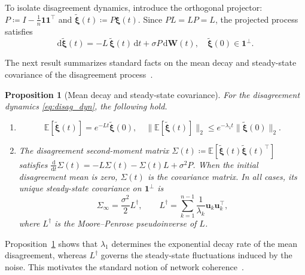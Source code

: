 \documentclass[11pt]{article}
\numberwithin{equation}{section}
\newtheorem{proposition}[theorem]{Proposition}
\theoremstyle{definition}
\theoremstyle{remark}
\begin{document}
To isolate disagreement dynamics, introduce the orthogonal projector: $P\coloneqq I-\frac{1}{n}\boldsymbol{1}\boldsymbol{1}^\top$ and $\widetilde{\boldsymbol{\xi}}(t)\coloneqq P\boldsymbol{\xi}(t).$
Since $PL=LP=L$, the projected process satisfies
\begin{equation}\label{eq:disag_dyn}
	\mathrm{d}\widetilde{\boldsymbol{\xi}}(t)
	=
	-L\,\widetilde{\boldsymbol{\xi}}(t)\,\mathrm{d}t
	+
	\sigma P\,\mathrm{d}\mathbf{W}(t),
	\quad
	\widetilde{\boldsymbol{\xi}}(0)\in \boldsymbol{1}^\perp.
\end{equation}

The next result summarizes standard facts on the mean decay and steady-state
covariance of the disagreement process~\cite{Bamieh2012}.

\begin{proposition}[Mean decay and steady-state covariance]
	\label{prop:consensus_covariance}
	For the disagreement dynamics \eqref{eq:disag_dyn}, the following hold.
	\begin{enumerate}
		\item[\textnormal{(i)}]
		\[
		\mathbb{E}[\widetilde{\boldsymbol{\xi}}(t)]
		=
		e^{-Lt}\widetilde{\boldsymbol{\xi}}(0),
		\quad
		\|\mathbb{E}[\widetilde{\boldsymbol{\xi}}(t)]\|_2
		\le
		e^{-\lambda_1 t}\|\widetilde{\boldsymbol{\xi}}(0)\|_2.
		\]
		\item[\textnormal{(ii)}]
		The disagreement second-moment matrix $\Sigma(t)\coloneqq
		\mathbb{E}\!\left[
		\widetilde{\boldsymbol{\xi}}(t)
		\widetilde{\boldsymbol{\xi}}(t)^\top
		\right]$
		satisfies $\frac{\mathrm{d}}{\mathrm{d}t}\Sigma(t)
		=
		-L\Sigma(t)-\Sigma(t)L+\sigma^2P$.
		When the initial disagreement mean is zero, $\Sigma(t)$ is the covariance
		matrix. In all cases, its unique steady-state covariance on
		$\boldsymbol{1}^\perp$ is
		\begin{equation}\label{eq:sigma_infty}
			\Sigma_\infty
			=
			\frac{\sigma^2}{2}L^\dagger,
			\qquad
			L^\dagger
			=
			\sum_{k=1}^{n-1}
			\frac{1}{\lambda_k}\boldsymbol{u}_k\boldsymbol{u}_k^\top,
		\end{equation}
		where $L^\dagger$ is the Moore--Penrose pseudoinverse of $L$.
	\end{enumerate}
\end{proposition}

Proposition~\ref{prop:consensus_covariance} shows that $\lambda_1$
determines the exponential decay rate of the mean disagreement, whereas
$L^\dagger$ governs the steady-state fluctuations induced by the noise.
This motivates the standard notion of network coherence~\cite{Bamieh2012}.
\end{document}

